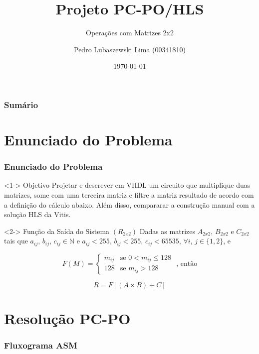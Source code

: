 \documentclass{beamer}
\title[Projeto PC-PO/HLS]{Projeto PC-PO/HLS}
\subtitle{Operações com Matrizes 2x2}
\author[Pedro Lubaszewski Lima]{Pedro Lubaszewski Lima (00341810)}
\institute[]{INF01175\\Sistemas Digitais para Computadores A}
\date[\today]{\today}
\begin{document}
    \begin{frame}
        \maketitle
    \end{frame}

    \begin{frame}
        \frametitle{Sumário}
        \tableofcontents
    \end{frame}

    \section{Enunciado do Problema}
    \begin{frame}
        \frametitle{Enunciado do Problema}

        \begin{block}<1->
            {Objetivo}
            Projetar e descrever em VHDL um
            circuito que multiplique duas matrizes,
            some com uma terceira matriz e filtre a
            matriz resultado de acordo com a definição
            do cálculo abaixo. Além disso, compararar
            a construção manual com a solução HLS da
            Vitis.
        \end{block}

        \begin{block}<2->
            {Função da Saída do Sistema $ (R_{2x2}) $}
            Dadas as matrizes $ A_{2x2} $, $ B_{2x2} $
            e $ C_{2x2} $ tais que $ a_{ij} $, $ b_{ij} $,
            $ c_{ij} \in \mathbb{N} $ e $ a_{ij} < 255 $,
            $ b_{ij} < 255 $, $ c_{ij} < 65535 $, $ \forall i $,
            $ j \in \{ 1,2 \}$, e 

            $$ F(M) = 
                \begin{cases}
                    m_{ij} & \text{se } 0 < m_{ij} \leqslant 128 \\
                    128 & \text{se } m_{ij} > 128
                \end{cases}
                \text{ , então}
            $$

            $$ R = F[(A \times B) + C] $$
        \end{block}
    \end{frame}

    \section{Resolução PC-PO}
    \begin{frame}
        \frametitle{Fluxograma ASM}
    \end{frame}
\end{document}
